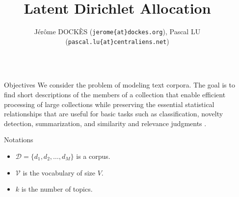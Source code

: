 \documentclass[final]{beamer}
\title{Latent Dirichlet Allocation} %
\author{J\'er\^ome DOCK\`ES {\small{(\texttt{jerome\{at\}dockes.org})}}, Pascal LU  {\small{(\texttt{pascal.lu\{at\}centraliens.net})}} } %
\institute{\'Ecole Normale Sup\'erieure de Cachan $-$ \today} %
\newlength{\sepwid}
\newlength{\onecolwid}
\begin{document}

\setlength{\belowcaptionskip}{2ex} %
\setlength\belowdisplayshortskip{2ex} %

\begin{frame}[t] %

\begin{columns}[t] %

\begin{column}{\sepwid}\end{column} %

\begin{column}{\onecolwid} %


\begin{alertblock}{Objectives}
We consider the problem of modeling text corpora. The goal is to find short descriptions of the members of a collection that enable efficient processing of large collections while preserving the essential statistical relationships that are useful for basic tasks such as classification, novelty detection, summarization, and similarity and relevance judgments  \cite{BNJ03}.
\end{alertblock}


\begin{block}{Notations}

\begin{itemize}
  \item $\mathcal{D} = \{d_{1},d_{2}, \ldots, d_{M}\}$ is a corpus.
  \item $\mathcal{V}$ is the vocabulary of size $V$.
  \item $k$ is the number of topics.
\end{itemize}


\end{block}
\end{column}
\end{columns}
\end{frame}
\end{document}
